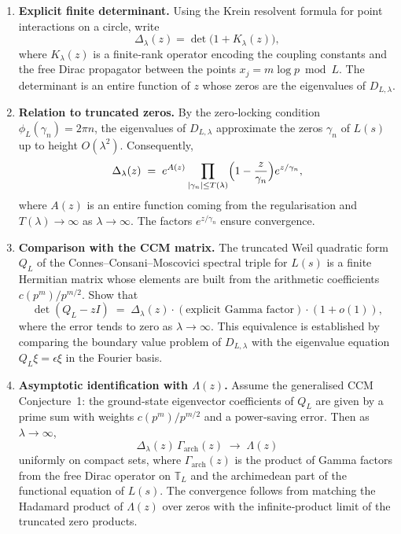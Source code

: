 \documentclass[12pt,a4paper]{article}
\begin{document}
\begin{enumerate}

\item \textbf{Explicit finite determinant.}  
Using the Krein resolvent formula for point interactions on a circle, write
\[
\Delta_\lambda(z) = \det\bigl(1 + K_\lambda(z)\bigr),
\]
where \(K_\lambda(z)\) is a finite‑rank operator encoding the coupling constants and the free Dirac propagator between the points \(x_j = m\log p \bmod L\).  The determinant is an entire function of \(z\) whose zeros are the eigenvalues of \(D_{L,\lambda}\).

\item \textbf{Relation to truncated zeros.}  
By the zero‑locking condition \(\phi_L(\gamma_n) = 2\pi n\), the eigenvalues of \(D_{L,\lambda}\) approximate the zeros \(\gamma_n\) of \(L(s)\) up to height \(O(\lambda^2)\).  Consequently,
\[
\Delta_\lambda(z) \;=\; e^{A(z)} \prod_{|\gamma_n| \le T(\lambda)} \Bigl(1 - \frac{z}{\gamma_n}\Bigr) e^{z/\gamma_n},
\]
where \(A(z)\) is an entire function coming from the regularisation and \(T(\lambda) \to \infty\) as \(\lambda\to\infty\).  The factors \(e^{z/\gamma_n}\) ensure convergence.

\item \textbf{Comparison with the CCM matrix.}  
The truncated Weil quadratic form \(Q_L\) of the Connes–Consani–Moscovici spectral triple for \(L(s)\) is a finite Hermitian matrix whose elements are built from the arithmetic coefficients \(c(p^m)/p^{m/2}\).  Show that
\[
\det(Q_L - zI) \;=\; \Delta_\lambda(z) \cdot (\text{explicit Gamma factor}) \cdot (1 + o(1)),
\]
where the error tends to zero as \(\lambda \to \infty\).  This equivalence is established by comparing the boundary value problem of \(D_{L,\lambda}\) with the eigenvalue equation \(Q_L\xi = \epsilon\xi\) in the Fourier basis.

\item \textbf{Asymptotic identification with \(\Lambda(z)\).}  
Assume the generalised CCM Conjecture~1: the ground‑state eigenvector coefficients of \(Q_L\) are given by a prime sum with weights \(c(p^m)/p^{m/2}\) and a power‑saving error.  Then as \(\lambda\to\infty\),
\[
\Delta_\lambda(z)\,\Gamma_{\text{arch}}(z) \;\longrightarrow\; \Lambda(z)
\]
uniformly on compact sets, where \(\Gamma_{\text{arch}}(z)\) is the product of Gamma factors from the free Dirac operator on \(\mathbb{T}_L\) and the archimedean part of the functional equation of \(L(s)\).  The convergence follows from matching the Hadamard product of \(\Lambda(z)\) over zeros with the infinite‑product limit of the truncated zero products.


\end{enumerate}
\end{document}
